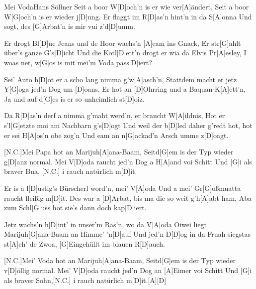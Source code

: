 \documentclass[../main.tex]{subfiles}
\begin{document}
\begin{song}[2]{Mei Voda}{Hans Söllner}{}
Seit a boor W[D]och'n is er wie ver[A]{ä}ndert,
Seit a boor W[G]och'n is er wieder j[D]ung.
Er flaggt im R[D]as'n hint'n in da S[A]onna
Und sogt, des [G]Arbat'n is mir vui z'd[D]umm.

Er drogt Bl[D]ue Jeans und de Hoor wachs'n [A]eam ins Gnack,
Er str[G]ahlt über's ganze G's[D]icht
Und die Kotl[D]ett'n drogt er wia da Elvis Pr[A]esley,
I woas net, w[G]os is mit mei'm Voda pass[D]iert?

Sei' Auto h[D]ot er a scho lang nimma g'w[A]asch'n,
Stattdem macht er jetz Y[G]oga jed'n Dog um [D]oans.
Er hot an [D]Ohrring und a Baquan-K[A]ett'n,
Ja und auf d[G]es is er so unheimlich st[D]oiz.

Da R[D]as'n derf a nimma g'maht werd'n, er braucht W[A]ildnis,
Hot er s'l[G]etzte moi am Nachbarn g's[D]ogt
Und weil der b[D]led daher g'redt hot, hot er sei H[A]os'n obe zog'n
Und eam an n[G]ackad'n Arsch umme z[D]oagt.

[N.C.]Mei Papa hot an Marijuh[A]ana-Baam, 
Seitd[G]em is der Typ wieder g[D]anz normal.
Mei V[D]oda raucht jed'n Dog a H[A]and voi Schitt 
Und [G]i als braver Bua,      [N.C.]  i rauch natürlich m[D]it.

Er is a l[D]ustig's Bürscherl word'n, mei' V[A]oda
Und a mei' Gr[G]oßmuatta raucht fleißig m[D]it.
Des war a [D]Arbat, bis ma die so weit g'h[A]abt ham,
Aba zum Schl[G]uss hot sie's dann doch kap[D]iert.

Jetz wachs'n h[D]int' in unser'm Ras'n, wo da V[A]oda Oiwei liegt
Marijuh[G]ana-Baam an Himme' 'n[D]auf
Und jed'n D[D]og in da Fruah siegstas st[A]eh' de Zwoa,
[G]Eingehüllt im blauen R[D]auch.

[N.C.]Mei' Voda hot an Marijuh[A]ana-Baam, 
Seitd[G]em is der Typ wieder v[D]{ö}llig normal.
Mei' V[D]oda raucht jed'n Dog an [A]Eimer voi Schitt 
Und [G]i als braver Sohn,[N.C.] i rauch natürlich m[D]it.[A]{\hh}[D]{\hh}
\end{song}
\end{document}
